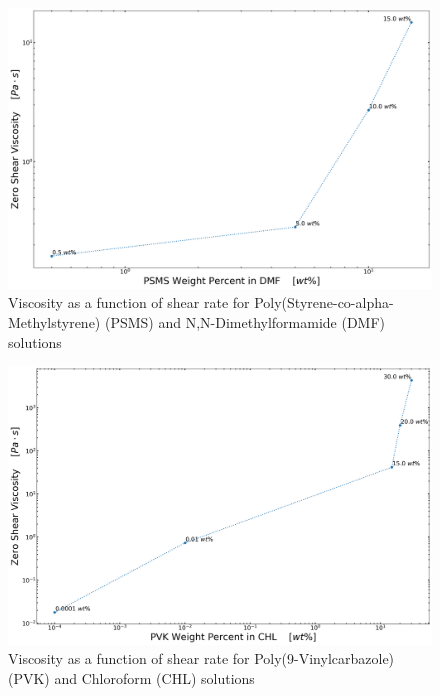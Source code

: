 \begin{figure}[!th]
\centering
\includegraphics[width=\textwidth]{./Figures/c_vs_v_PSMSinDMF.png}
\decoRule
\caption[Viscosity as a function of shear rate for Poly(Styrene-co-alpha-Methylstyrene) (PSMS) and N,N-Dimethylformamide (DMF) solutions]{Viscosity as a function of shear rate for Poly(Styrene-co-alpha-Methylstyrene) (PSMS) and N,N-Dimethylformamide (DMF) solutions}
\label{fig:c_vs_v_PSMSinDMF}
\end{figure}

\begin{figure}[!th]
\centering
\includegraphics[width=\textwidth]{./Figures/c_vs_v_PVKinCHL.png}
\decoRule
\caption[Viscosity as a function of shear rate for Poly(9-Vinylcarbazole) (PVK) and Chloroform (CHL) solutions]{Viscosity as a function of shear rate for Poly(9-Vinylcarbazole) (PVK) and Chloroform (CHL) solutions}
\label{fig:c_vs_v_PVKinCHL}
\end{figure}

